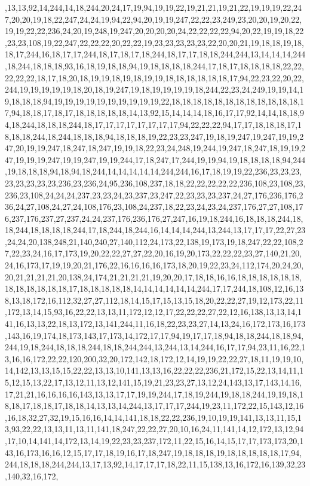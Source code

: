 ,13,13,92,14,244,14,18,244,20,24,17,19,94,19,19,22,19,21,21,19,21,22,19,19,19,22,247,20,20,19,18,22,247,24,24,19,94,22,94,20,19,19,247,22,22,23,249,23,20,20,19,20,22,19,19,22,22,236,24,20,19,248,19,247,20,20,20,20,24,22,22,22,22,94,20,22,19,19,18,22,23,23,108,19,22,247,22,22,22,20,22,22,19,23,23,23,23,23,22,20,20,21,19,18,18,19,18,18,17,244,16,18,17,17,244,18,17,18,17,18,244,18,17,17,18,18,244,244,13,14,14,14,244,18,244,18,18,18,93,16,18,19,18,18,94,19,18,18,18,18,244,17,18,17,18,18,18,18,22,22,22,22,22,18,17,18,20,18,19,19,18,19,18,19,19,18,18,18,18,18,18,17,94,22,23,22,20,22,244,19,19,19,19,19,18,20,18,19,247,19,18,19,19,19,19,18,244,22,23,24,249,19,19,14,19,18,18,18,94,19,19,19,19,19,19,19,19,19,19,22,18,18,18,18,18,18,18,18,18,18,18,18,17,94,18,18,17,18,17,18,18,18,18,18,14,13,92,15,14,14,14,18,16,17,17,92,14,14,18,18,94,18,244,18,18,18,244,18,17,17,17,17,17,17,17,17,94,22,22,22,94,17,17,18,18,18,17,18,18,18,244,18,244,18,18,18,94,18,18,18,19,22,23,23,247,19,18,19,247,19,247,19,19,247,20,19,19,247,18,247,18,247,19,19,18,22,23,24,248,19,244,19,247,18,247,18,19,19,247,19,19,19,247,19,19,247,19,19,244,17,18,247,17,244,19,19,94,19,18,18,18,18,94,244,19,18,18,18,94,18,94,18,244,14,14,14,14,14,244,244,16,17,18,19,19,22,236,23,23,23,23,23,23,23,23,236,23,236,24,95,236,108,237,18,18,22,22,22,22,22,236,108,23,108,23,236,23,108,24,24,24,237,23,23,24,23,237,23,247,22,23,23,23,237,24,27,176,236,176,236,24,27,108,24,27,24,108,176,23,108,24,237,18,22,23,24,23,24,237,176,27,27,108,176,237,176,237,27,237,24,24,237,176,236,176,27,247,16,19,18,244,16,18,18,18,244,18,18,244,18,18,18,18,244,17,18,244,18,244,16,14,14,14,244,13,244,13,17,17,17,22,27,23,24,24,20,138,248,21,140,240,27,140,112,24,173,22,138,19,173,19,18,247,22,22,108,27,22,23,24,16,17,173,19,20,22,22,27,27,22,20,16,19,20,173,22,22,22,23,27,140,21,20,24,16,173,17,19,19,20,21,176,22,16,16,16,16,173,18,20,19,22,23,24,112,174,20,24,20,20,21,21,21,21,20,138,24,174,21,21,21,21,19,20,20,17,18,18,16,16,18,18,18,18,18,18,18,18,18,18,18,18,17,18,18,18,18,18,14,14,14,14,14,14,244,17,17,244,18,108,12,16,138,13,18,172,16,112,32,27,27,112,18,14,15,17,15,13,15,18,20,22,22,27,19,12,173,22,11,172,13,14,15,93,16,22,22,13,13,11,172,12,12,17,22,22,22,27,22,12,16,138,13,13,14,141,16,13,13,22,18,13,172,13,141,244,11,16,18,22,23,23,27,14,13,24,16,172,173,16,173,143,16,19,174,18,173,143,17,173,14,172,17,17,94,19,17,17,18,94,18,18,244,18,18,94,244,19,18,244,18,18,18,244,18,18,244,244,13,244,13,14,244,16,17,17,94,23,11,16,22,13,16,16,172,22,22,120,200,32,20,172,142,18,172,12,14,19,19,22,22,27,18,11,19,19,10,14,142,13,13,15,15,22,22,13,13,10,141,13,13,16,22,22,22,236,21,172,15,22,13,14,11,15,12,15,13,22,17,13,12,11,13,12,141,15,19,21,23,23,27,13,12,24,143,13,17,143,14,16,17,21,21,16,16,16,16,143,13,13,17,17,19,19,244,17,18,19,244,19,18,18,244,19,19,18,18,18,17,18,18,17,18,18,14,13,13,14,244,13,17,17,17,244,19,23,11,172,22,15,143,12,16,16,18,32,27,32,19,15,16,16,14,14,141,18,18,22,22,236,19,10,19,19,141,13,13,11,15,13,93,22,22,13,13,11,13,11,141,18,247,22,22,27,20,10,16,24,11,141,14,12,172,13,12,94,17,10,14,141,14,172,13,14,19,22,23,23,237,172,11,22,15,16,14,15,17,17,173,173,20,143,16,173,16,16,12,15,17,17,18,19,16,17,18,247,19,18,18,18,19,18,18,18,18,18,17,94,244,18,18,18,244,244,13,17,13,92,14,17,17,17,18,22,11,15,138,13,16,172,16,139,32,23,140,32,16,172,